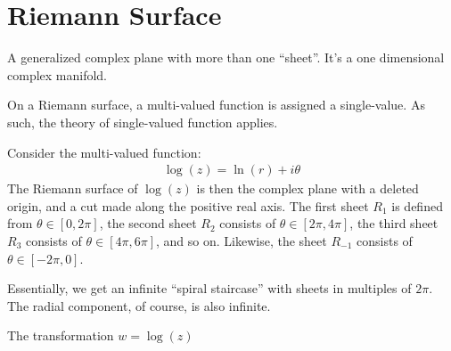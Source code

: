 \documentclass[12pt, english]{book}
\begin{document}
	
	\section{Riemann Surface} \label{Riemann Surface} 
	
	\begin{definition}
		\label{Riemann Surface Informal Definition - Complex}
		A generalized complex plane with more than one ``sheet''. It's a one dimensional complex manifold.
	\end{definition}
	
	On a Riemann surface, a multi-valued function is assigned a single-value. As such, the theory of single-valued function applies.
	
	\begin{example}
		Consider the multi-valued function:
		\begin{align*}
			\log(z) = \ln(r) + i\theta
		\end{align*}
		The Riemann surface of \(\log(z)\) is then the complex plane with a deleted origin, and a cut made along the positive real axis. The first sheet \(R_1\) is defined from \(\theta \in [0, 2\pi]\), the second sheet \(R_2\) consists of \(\theta \in [2\pi, 4\pi]\), the third sheet \(R_3\) consists of \(\theta \in [4\pi, 6\pi]\), and so on. Likewise, the sheet \(R_{-1}\) consists of \(\theta \in [-2\pi, 0]\). 
		
		Essentially, we get an infinite ``spiral staircase'' with sheets in multiples of \(2\pi\). The radial component, of course, is also infinite.
		
		\begin{figure}[H]
			\centering
		\end{figure}
	
		The transformation \(w = \log(z)\)
		
	\end{example}
\end{document}

